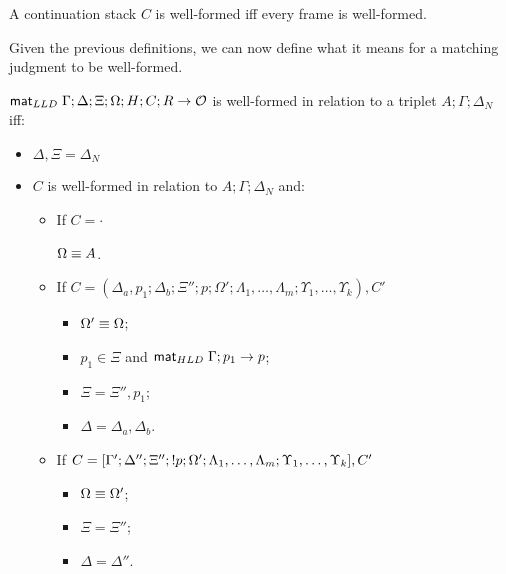 \begin{definition}
A continuation stack $C$ is well-formed iff every frame is well-formed.
\end{definition}

Given the previous definitions, we can now define what it means for a matching
judgment to be well-formed.

\begin{definition}

$\mathsf{mat}_{LLD} \; \Gamma; \Delta; \Xi; \Omega; H; C; R \rightarrow \mathcal{O}$ is well-formed in relation to a triplet $A; \Gamma; \Delta_{N}$ iff:

\begin{itemize}[leftmargin=*]
   \item $\Delta, \Xi = \Delta_{N}$
   \item $C$ is well-formed in relation to $A; \Gamma; \Delta_{N}$ and:
   \begin{itemize}[leftmargin=\secondm]
      \item If $C = \cdot$
   
      $\Omega \equiv A$.
   
      \item If $C = (\Delta_a, p_1; \Delta_b; \Xi''; p; \Omega'; \Lambda_1,
            \dotsc, \Lambda_m; \Upsilon_1, \dotsc, \Upsilon_k), C'$
   
      \begin{itemize}[leftmargin=\thirdm]
         \item $\Omega' \equiv \Omega$;
         \item $p_1 \in \Xi$ and $\mathsf{mat}_{HLD} \; \Gamma; p_1 \rightarrow p$;
         \item $\Xi = \Xi'', p_1$;
         \item $\Delta = \Delta_a, \Delta_b$.
      \end{itemize}
      \item If $C = [\Gamma'; \Delta''; \Xi''; {!} p; \Omega'; \Lambda_1,
      \dotsc, \Lambda_m; \Upsilon_1, \dotsc, \Upsilon_k], C'$
      \begin{itemize}[leftmargin=\thirdm]
         \item $\Omega \equiv \Omega'$;
         \item $\Xi = \Xi''$;
         \item $\Delta = \Delta''$.
      \end{itemize}
   \end{itemize}
\end{itemize}

\end{definition}

